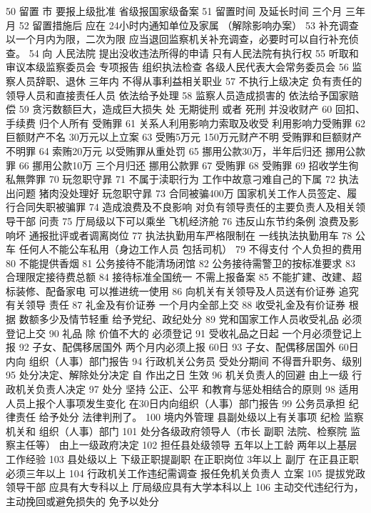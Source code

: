 \documentclass[11pt]{ctexart}
\begin{document}
50 留置 市
要报上级批准 省级报国家级备案
51 留置时间 及延长时间
 三个月 三年月
52 留置措施后 应在
 24小时内通知单位及家属 （解除影响办案）
53 补充调查以一个月内为限，二次为限
应当退回监察机关补充调查，必要时可以自行补充侦查。
54 向 人民法院 提出没收违法所得的申请
只有人民法院有执行权
55 听取和审议本级监察委员会 专项报告 组织执法检查
各级人民代表大会常务委员会
56 监察人员辞职、退休 三年内 不得从事利益相关职业
57 不执行上级决定 负有责任的领导人员和直接责任人员
依法给予处理
58 监察人员造成损害的
依法给予国家赔偿
59 贪污数额巨大，造成巨大损失
处 无期徙刑 或者 死刑 并没收财产
60 回扣、手续费 归个人所有
受贿罪
61 关系人利用影响力索取及收受
利用影响力受贿罪
62 巨额财产不名
 30万元以上立案
63 受贿5万元 150万元财产不明
受贿罪和巨额财产不明罪
64 索贿20万元
以受贿罪从重处罚
65 挪用公款30万，半年后归还
挪用公款罪
66 挪用公款10万 三个月归还
挪用公款罪
67 受贿罪
68 受贿罪
69 招收学生徇私無弊罪
70 玩忽职守暃
71 不属于渎职行为
工作中故意刁难自己的下属
72 执法出问题 猪肉没处理好
玩忽职守暃
73 合同被骗400万
国家机关工作人员签定、履行合同失职被骗罪
74 造成浪费及不良影响 对负有领导责任的主要负责人及相关领导干部
问责
75 厅局级以下可以乘坐
飞机经济舱
76 违反山东节约条例 浪费及影响坏
通报批评或者调离岗位
77 执法执勤用车严格限制在
一线执法执勤用车
78 公车
任何人不能公车私用（身边工作人员 包括司机）
79 不得支付 个人负担的费用
80 不能提供香烟
81 公务接待不能清场闭馆
82 公务接待需警卫的按标准要求
83 合理限定接待费总额
84 接待标准全国统一
不需上报备案
85 不能扩建、改建、超标装修、配备家电
可以推进统一使用
86 向机关有关领导及人员送有价证券
追究 有关领导 责任
87 礼金及有价证券
一个月内全部上交
88 收受礼金及有价证券
根据 数额多少及情节轻重 给予党纪、政纪处分
89 党和国家工作人员收受礼品
必须登记上交
90 礼品
除 价值不大的 必须登记
91 受收礼品之日起
 一个月必须登记上报
92 子女、配偶移居国外
 两个月内必须上报 60日
93 子女、配偶移居国外
 60日内向 组织（人事）部门报告
94 行政机关公务员
受处分期间 不得晋升职务、级别
95 处分决定、解除处分决定
自 作出之日 生效
96 机关负责人的回避
由上一级 行政机关负责人决定
97 处分
坚持 公正、公平 和教育与惩处相结合的原则
98 适用人员上报个人事项发生变化
在30日内向组织（人事）部门报告
99 公务员承担
纪律责任 给予处分
法律判刑了。
100 境内外管理 县副处级以上有关事项
纪检 监察机关和 组织（人事）部门
101 处分各级政府领导人（市长 副职 法院、检察院 监察主任等）
由上一级政府决定
102 担任县处级领导
五年以上工龄 两年以上基层工作经验
103 县处级以上 下级正职提副职
在正职岗位 3年以上
副厅 在正县正职必须三年以上
104 行政机关工作违纪需调查
报任免机关负责人 立案
105 提拔党政领导干部 应具有大专科以上 厅局级应具有大学本科以上
106 主动交代违纪行为，主动挽回或避免损失的
免予以处分
\end{document}
